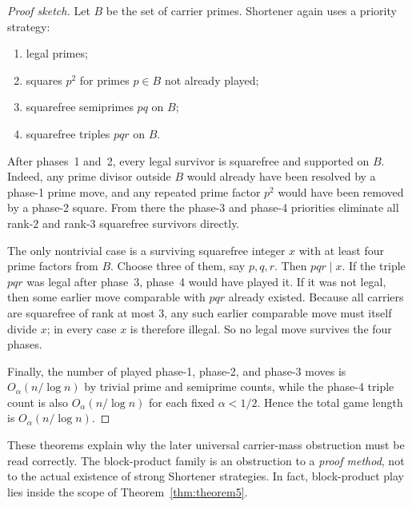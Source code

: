 \begin{proof}[Proof sketch]
Let $B$ be the set of carrier primes.  Shortener again uses a priority strategy:
\begin{enumerate}
  \item legal primes;
  \item squares $p^2$ for primes $p\in B$ not already played;
  \item squarefree semiprimes $pq$ on $B$;
  \item squarefree triples $pqr$ on $B$.
\end{enumerate}

After phases~1 and~2, every legal survivor is squarefree and supported on $B$.
Indeed, any prime divisor outside $B$ would already have been resolved by a
phase-1 prime move, and any repeated prime factor $p^2$ would have been removed
by a phase-2 square.  From there the phase-3 and phase-4 priorities eliminate
all rank-$2$ and rank-$3$ squarefree survivors directly.

The only nontrivial case is a surviving squarefree integer $x$ with at least
four prime factors from $B$.  Choose three of them, say $p,q,r$.  Then
$pqr\mid x$.  If the triple $pqr$ was legal after phase~3, phase~4 would have
played it.  If it was not legal, then some earlier move comparable with $pqr$
already existed.  Because all carriers are squarefree of rank at most $3$, any
such earlier comparable move must itself divide $x$; in every case $x$ is
therefore illegal.  So no legal move survives the four phases.

Finally, the number of played phase-1, phase-2, and phase-3 moves is
$O_\alpha(n/\log n)$ by trivial prime and semiprime counts, while the phase-4
triple count is also $O_\alpha(n/\log n)$ for each fixed $\alpha<1/2$.  Hence
the total game length is $O_\alpha(n/\log n)$.
\end{proof}

\begin{remark}
These theorems explain why the later universal carrier-mass obstruction must be
read correctly.  The block-product family is an obstruction to a \emph{proof
method}, not to the actual existence of strong Shortener strategies.  In fact,
block-product play lies inside the scope of Theorem~\ref{thm:theorem5}.
\end{remark}
